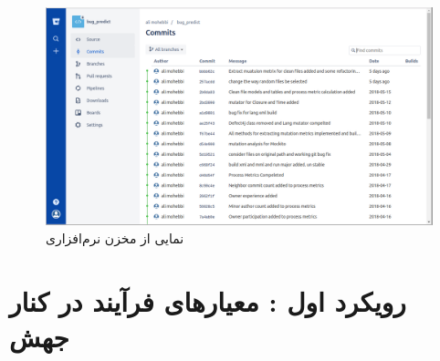  \begin{figure}[H]
	\centering
	\includegraphics[width=1\textwidth]{img/case_study/bitbucket.png}
	\caption{نمایی از مخزن نرم‌افزاری}
	\label{fig:bitbucket}
\end{figure}


\section{رویکرد اول : معیارهای فرآیند در کنار جهش}

